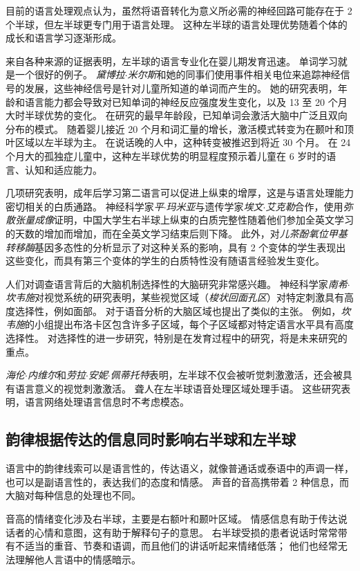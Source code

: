 目前的语言处理观点认为，虽然将语音转化为意义所必需的神经回路可能存在于 2 个半球，但左半球更专门用于语言处理。
这种左半球的语言处理优势随着个体的成长和语言学习逐渐形成。


来自各种来源的证据表明，左半球的语言专业化在婴儿期发育迅速。
单词学习就是一个很好的例子。
\textit{黛博拉$\cdot$米尔斯}和她的同事们使用事件相关电位来追踪神经信号的发展，这些神经信号是针对儿童所知道的单词而产生的。
她的研究表明，年龄和语言能力都会导致对已知单词的神经反应强度发生变化，以及 13 至 20 个月大时半球优势的变化。
在研究的最早年龄段，已知单词会激活大脑中广泛且双向分布的模式。
随着婴儿接近 20 个月和词汇量的增长，激活模式转变为在颞叶和顶叶区域以左半球为主。
在说话晚的人中，这种转变被推迟到将近 30 个月。
在 24 个月大的孤独症儿童中，这种左半球优势的明显程度预示着儿童在 6 岁时的语言、认知和适应能力。


几项研究表明，成年后学习第二语言可以促进上纵束的增厚，这是与语言处理能力密切相关的白质通路。
神经科学家\textit{平$\cdot$玛米亚}与遗传学家\textit{埃文$\cdot$艾克勒}合作，使用\textit{弥散张量成像}证明，中国大学生右半球上纵束的白质完整性随着他们参加全英文学习的天数的增加而增加，而在全英文学习结束后则下降。
此外，对\textit{儿茶酚氧位甲基转移酶}基因多态性的分析显示了对这种关系的影响，具有 2 个变体的学生表现出这些变化，而具有第三个变体的学生的白质特性没有随语言经验发生变化。


人们对调查语言背后的大脑机制选择性的大脑研究非常感兴趣。
神经科学家\textit{南希$\cdot$坎韦施}对视觉系统的研究表明，某些视觉区域（\textit{梭状回面孔区}）对特定刺激具有高度选择性，例如面部。
对于语音分析的大脑区域也提出了类似的主张。
例如，\textit{坎韦施}的小组提出布洛卡区包含许多子区域，每个子区域都对特定语言水平具有高度选择性。
对选择性的进一步研究，特别是在发育过程中的研究，将是未来研究的重点。


\textit{海伦$\cdot$内维尔}和\textit{劳拉$\cdot$安妮$\cdot$佩蒂托特}表明，左半球不仅会被听觉刺激激活，还会被具有语言意义的视觉刺激激活。
聋人在左半球语音处理区域处理手语。
这些研究表明，语言网络处理语言信息时不考虑模态。



\subsection{韵律根据传达的信息同时影响右半球和左半球}

语言中的韵律线索可以是语言性的，传达语义，就像普通话或泰语中的声调一样，也可以是副语言性的，表达我们的态度和情感。
声音的音高携带着 2 种信息，而大脑对每种信息的处理也不同。


音高的情绪变化涉及右半球，主要是右额叶和颞叶区域。
情感信息有助于传达说话者的心情和意图，这有助于解释句子的意思。
右半球受损的患者说话时常常带有不适当的重音、节奏和语调，而且他们的讲话听起来情绪低落；
他们也经常无法理解他人言语中的情感暗示。


